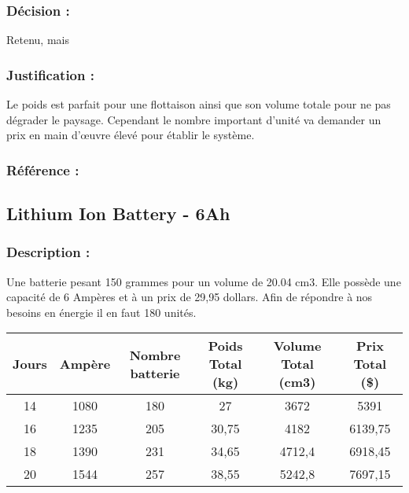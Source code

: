 \subsubsection{Décision :} Retenu, mais
\subsubsection{Justification :} Le poids est parfait pour une flottaison ainsi que son volume totale pour ne pas dégrader le paysage. Cependant le nombre important d’unité va demander un prix en main d’œuvre élevé pour établir le système.
\subsubsection{Référence : } 


\subsection{Lithium Ion Battery - 6Ah}
\subsubsection{Description :} 
Une batterie pesant 150 grammes pour un volume de 20.04 cm3. Elle possède une capacité de 6 Ampères et à un prix de 29,95 dollars. Afin de répondre à nos besoins en énergie il en faut 180 unités.

\begin{table}[!hbtp]
\begin{tabular}{|c|c|c|c|c|c|}
\hline
Jours & Ampère & Nombre batterie & Poids Total (kg) & Volume Total (cm3) & Prix Total (\$) \\ \hline
14    & 1080   & 180                                                        & 27                                                          & 3672                                                          & 5391            \\ \hline
16    & 1235   & 205                                                        & 30,75                                                       & 4182                                                          & 6139,75         \\ \hline
18    & 1390   & 231                                                        & 34,65                                                       & 4712,4                                                        & 6918,45         \\ \hline
20    & 1544   & 257                                                        & 38,55                                                       & 5242,8                                                        & 7697,15         \\ \hline
\end{tabular}
\end{table}

